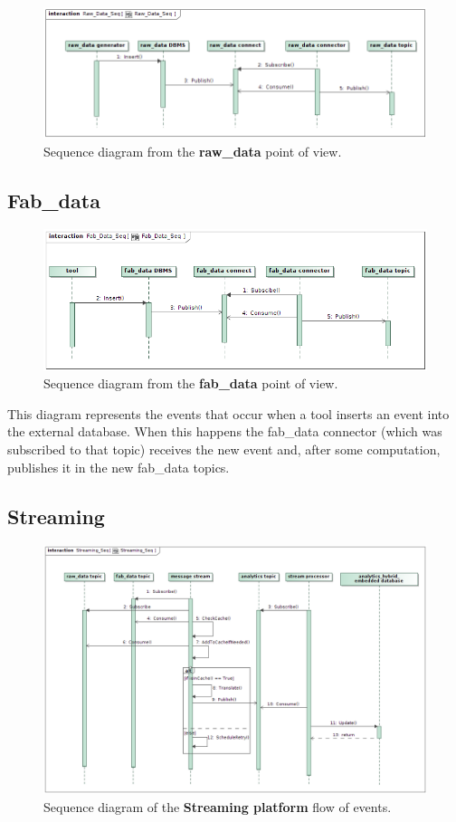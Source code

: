 \begin{figure}[H]
\centering
\includegraphics[width=\textwidth]{img/Raw_Data_Seq.png}
\caption{Sequence diagram from the \textbf{raw\_data} point of view.}
\end{figure}

\subsection{Fab\_data}

\begin{figure}[H]
\centering
\includegraphics[width=\textwidth]{img/Fab_Data_Seq.png}
\caption{Sequence diagram from the \textbf{fab\_data} point of view.}
\end{figure}

This diagram represents the events that occur when a tool inserts an event into the external database. When this happens the fab\_data connector (which was subscribed to that topic) receives the new event and, after some computation, publishes it in the new fab\_data topics.

\subsection{Streaming}
\begin{figure}[H]
\centering
\includegraphics[width=\textwidth]{img/Streaming_Seq.png}
\caption{Sequence diagram of the \textbf{Streaming platform} flow of events.}
\end{figure}

